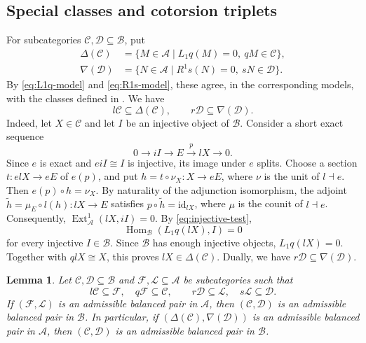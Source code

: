 \documentclass[11pt]{amsart}
\newtheorem{lemma}[theorem]{Lemma}
\theoremstyle{definition}
\theoremstyle{remark}
\theoremstyle{plain}
\numberwithin{equation}{section}
\begin{document}
\subsection{Special classes and cotorsion triplets}
For subcategories $\mathcal{C},\mathcal{D}\subseteq\mathcal{B}$,
put
\begin{equation}\label{eq:structural-classes}
	\begin{split}
		\Delta(\mathcal{C})
		&=\{M\in\mathcal{A}\mid L_1q(M)=0,\ qM\in\mathcal{C}\},\\
		\nabla(\mathcal{D})
		&=\{N\in\mathcal{A}\mid R^1s(N)=0,\ sN\in\mathcal{D}\}.
	\end{split}
\end{equation}
By \eqref{eq:L1q-model} and \eqref{eq:R1s-model},
these agree, in the corresponding models, with the
classes defined in \cite[Subsections~3.1 and~3.6]{Hu}. We have
\begin{equation}\label{eq:induced-in-structural}
	l\mathcal{C}\subseteq\Delta(\mathcal{C}),
	\qquad
	r\mathcal{D}\subseteq\nabla(\mathcal{D}).
\end{equation}
Indeed, let $X\in\mathcal{C}$ and let $I$ be an injective object of $\mathcal{B}$. Consider a short exact sequence
\[
0 \to iI \to E\xrightarrow{p}lX \to 0.
\]
Since $e$ is exact and $eiI\cong I$ is injective,
its image under $e$ splits. Choose a section
$t:elX\to eE$ of $e(p)$, and put
$h=t\circ\nu_X:X\to eE$, where $\nu$ is the unit
of $l\dashv e$. Then $e(p)\circ h=\nu_X$.
By naturality of the adjunction isomorphism, the adjoint
$\widetilde h = \mu_E\circ l(h):lX\to E$ satisfies
$p\circ\widetilde h=\mathrm{id}_{lX}$, where $\mu$ is the counit of $l\dashv e$. Consequently,
$\operatorname{Ext}_{\mathcal{A}}^1(lX,iI)=0$.
By \eqref{eq:injective-test},
\[
\operatorname{Hom}_{\mathcal{B}}(L_1q(lX),I)=0
\]
for every injective $I\in\mathcal{B}$.
Since $\mathcal{B}$ has enough injective objects,
$L_1q(lX)=0$. Together with $qlX\cong X$, this proves $lX\in\Delta(\mathcal{C})$. Dually, we have $r\mathcal{D}\subseteq\nabla(\mathcal{D})$.


\begin{lemma}\label{lem:reflection}
	Let $\mathcal{C},\mathcal{D}\subseteq\mathcal{B}$ and
	$\mathcal{F},\mathcal{L}\subseteq\mathcal{A}$ be subcategories such that
	\[
	l\mathcal{C}\subseteq\mathcal{F},\quad
	q\mathcal{F}\subseteq\mathcal{C},\qquad
	r\mathcal{D}\subseteq\mathcal{L},\quad
	s\mathcal{L}\subseteq\mathcal{D}.
	\]
	If $(\mathcal{F},\mathcal{L})$ is an admissible balanced pair in $\mathcal{A}$, then $(\mathcal{C},\mathcal{D})$ is an
	admissible balanced pair in $\mathcal{B}$.
	In particular, if $(\Delta(\mathcal{C}),\nabla(\mathcal{D}))$
	is an admissible balanced pair in $\mathcal{A}$, then $(\mathcal{C},\mathcal{D})$ is an admissible balanced pair in $\mathcal{B}$.
\end{lemma}
\end{document}
